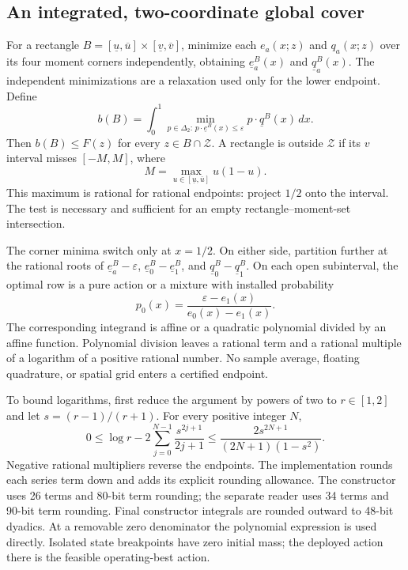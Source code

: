 \subsection{An integrated, two-coordinate global cover}\label{sec:cover51}
For a rectangle $B=[\underline u,\overline u]\times[\underline v,\overline v]$, minimize each $e_a(x;z)$ and $q_a(x;z)$ over its four moment corners independently, obtaining $\underline e_a^B(x)$ and $\underline q_a^B(x)$. The independent minimizations are a relaxation used only for the lower endpoint. Define
\begin{equation}\label{eq:boxlower51}
 b(B)=\int_0^1\min_{p\in\Delta_2:\,p\cdot\underline e^B(x)\le\varepsilon}
 p\cdot\underline q^B(x)\,dx.
\end{equation}
Then $b(B)\le F(z)$ for every $z\in B\cap\mathcal Z$. A rectangle is outside $\mathcal Z$ if its $v$ interval misses $[-M,M]$, where
\[
 M=\max_{u\in[\underline u,\overline u]}u(1-u).
\]
This maximum is rational for rational endpoints: project $1/2$ onto the interval. The test is necessary and sufficient for an empty rectangle--moment-set intersection.

The corner minima switch only at $x=1/2$. On either side, partition further at the rational roots of $\underline e_a^B-\varepsilon$, $\underline e_0^B-\underline e_1^B$, and $\underline q_0^B-\underline q_1^B$. On each open subinterval, the optimal row is a pure action or a mixture with installed probability
\[
 p_0(x)=\frac{\varepsilon-e_1(x)}{e_0(x)-e_1(x)}.
\]
The corresponding integrand is affine or a quadratic polynomial divided by an affine function. Polynomial division leaves a rational term and a rational multiple of a logarithm of a positive rational number. No sample average, floating quadrature, or spatial grid enters a certified endpoint.

To bound logarithms, first reduce the argument by powers of two to $r\in[1,2]$ and let $s=(r-1)/(r+1)$. For every positive integer $N$,
\begin{equation}\label{eq:log51}
 0\le \log r-2\sum_{j=0}^{N-1}\frac{s^{2j+1}}{2j+1}
 \le\frac{2s^{2N+1}}{(2N+1)(1-s^2)}.
\end{equation}
Negative rational multipliers reverse the endpoints. The implementation rounds each series term down and adds its explicit rounding allowance. The constructor uses 26 terms and 80-bit term rounding; the separate reader uses 34 terms and 90-bit term rounding. Final constructor integrals are rounded outward to 48-bit dyadics. At a removable zero denominator the polynomial expression is used directly. Isolated state breakpoints have zero initial mass; the deployed action there is the feasible operating-best action.

